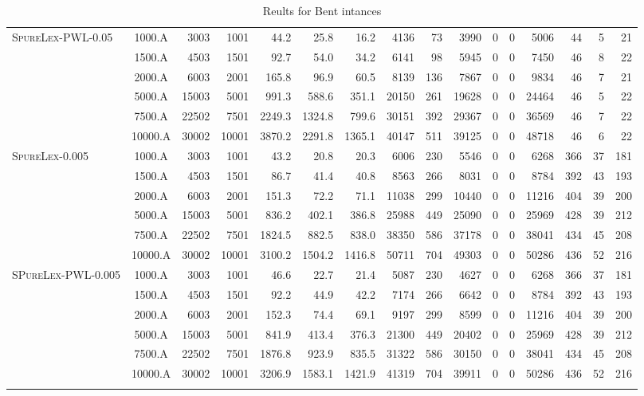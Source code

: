 \documentclass{article}
\begin{document}
\begin{table}[htb]
\begin{tabular}{l|c|rr|rrr|rrrrrr|rrr}
\textsc{SpureLex-PWL}-0.05 & 1000.A & 3003 & 1001 & 44.2 & 25.8 & 16.2 &  4136 & 73 & 3990 & 0 & 0 & 5006 & 44 & 5 & 21 \\
& 1500.A & 4503 & 1501 & 92.7 & 54.0 & 34.2 &  6141 & 98 & 5945 & 0 & 0 & 7450 & 46 & 8 & 22 \\ 
& 2000.A & 6003 & 2001 & 165.8 & 96.9 & 60.5 &  8139 & 136 & 7867 & 0 & 0 & 9834 & 46 & 7 & 21 \\
& 5000.A & 15003 & 5001 & 991.3 & 588.6 & 351.1 &  20150 & 261 & 19628 & 0 & 0 & 24464 & 46 & 5 & 22 \\
& 7500.A & 22502 & 7501 & 2249.3 & 1324.8 & 799.6 &  30151 & 392 & 29367 & 0 & 0 & 36569 & 46 & 7 & 22 \\
& 10000.A & 30002 & 10001 & 3870.2 & 2291.8 & 1365.1 &  40147 & 511 & 39125 & 0 & 0 & 48718 & 46 & 6 & 22 \\

\hline
\textsc{SpureLex}-0.005 & 1000.A & 3003 & 1001 & 43.2 & 20.8 & 20.3 &  6006 & 230 & 5546 & 0 & 0 & 6268 & 366 & 37 & 181 \\
& 1500.A & 4503 & 1501 & 86.7 & 41.4 & 40.8 &  8563 & 266 & 8031 & 0 & 0 & 8784 & 392 & 43 & 193 \\
& 2000.A & 6003 & 2001 & 151.3 & 72.2 & 71.1 &  11038 & 299 & 10440 & 0 & 0 & 11216 & 404 & 39 & 200 \\
& 5000.A & 15003 & 5001 & 836.2 & 402.1 & 386.8 &  25988 & 449 & 25090 & 0 & 0 & 25969 & 428 & 39 & 212 \\
& 7500.A & 22502 & 7501 & 1824.5 & 882.5 & 838.0 &  38350 & 586 & 37178 & 0 & 0 & 38041 & 434 & 45 & 208 \\
& 10000.A & 30002 & 10001 & 3100.2 & 1504.2 & 1416.8 &  50711 & 704 & 49303 & 0 & 0 & 50286 & 436 & 52 & 216 \\
\hline

\textsc{SPureLex-PWL}-0.005 & 1000.A & 3003 & 1001 & 46.6 & 22.7 & 21.4 &  5087 & 230 & 4627 & 0 & 0 & 6268 & 366 & 37 & 181 \\
& 1500.A & 4503 & 1501 & 92.2 & 44.9 & 42.2 &  7174 & 266 & 6642 & 0 & 0 & 8784 & 392 & 43 & 193 \\
& 2000.A & 6003 & 2001 & 152.3 & 74.4 & 69.1 &  9197 & 299 & 8599 & 0 & 0 & 11216 & 404 & 39 & 200 \\
& 5000.A & 15003 & 5001 & 841.9 & 413.4 & 376.3 &  21300 & 449 & 20402 & 0 & 0 & 25969 & 428 & 39 & 212 \\
& 7500.A & 22502 & 7501 & 1876.8 & 923.9 & 835.5 &  31322 & 586 & 30150 & 0 & 0 & 38041 & 434 & 45 & 208 \\
 & 10000.A & 30002 & 10001 & 3206.9 & 1583.1 & 1421.9 &  41319 & 704 & 39911 & 0 & 0 & 50286 & 436 & 52 & 216 \\
\hline

		\noalign{\smallskip}
        \lasthline
        
	\end{tabular}
	
	\caption{Reults for Bent intances}
\end{table}
\end{document}
